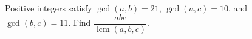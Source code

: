 Positive integers satisfy $\gcd(a,b)=21$, $\gcd(a,c)=10$, and $\gcd(b,c)=11$. Find $\dfrac{abc}{\operatorname{lcm}(a,b,c)}$.
